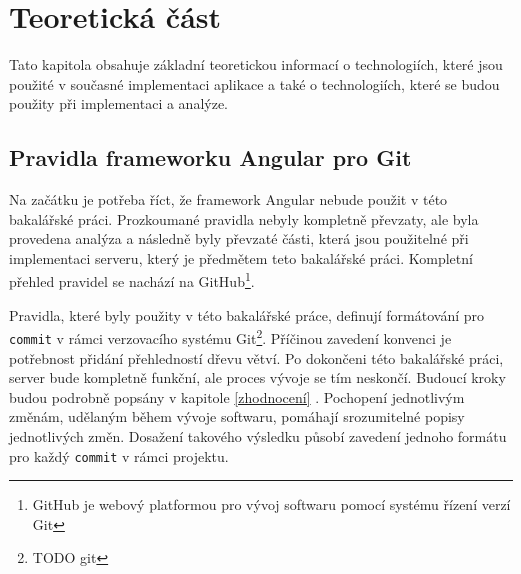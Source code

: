 \chapter{Teoretická část}\label{chapter:resere}
Tato kapitola obsahuje základní teoretickou informací o technologiích, které jsou použité v současné implementaci aplikace a také o technologiích, které se budou použity při implementaci a analýze.

\section{Pravidla frameworku Angular pro Git}\label{reserse:git}
    Na začátku je potřeba říct, že framework Angular nebude použit v této bakalářské práci. Prozkoumané pravidla nebyly kompletně převzaty, ale byla provedena analýza a následně byly převzaté části, která jsou použitelné při implementaci serveru, který je předmětem teto bakalářské práci. Kompletní přehled pravidel se nachází na GitHub\footnote{ GitHub je webový platformou pro vývoj softwaru pomocí systému řízení verzí Git}\cite{angular-git}.
    
    Pravidla, které byly použity v této bakalářské práce, definují formátování pro \verb|commit| v rámci verzovacího systému Git\footnote{TODO git}. Příčinou zavedení konvenci je potřebnost přidání přehledností dřevu větví. Po dokončeni této bakalářské práci, server bude kompletně funkční, ale proces vývoje se tím neskončí. Budoucí kroky budou podrobně popsány v kapitole \ref{zhodnocení} . Pochopení jednotlivým změnám, udělaným během vývoje softwaru, pomáhají srozumitelné popisy jednotlivých změn. Dosažení takového výsledku působí zavedení jednoho formátu pro každý \verb|commit| v rámci projektu.
    
